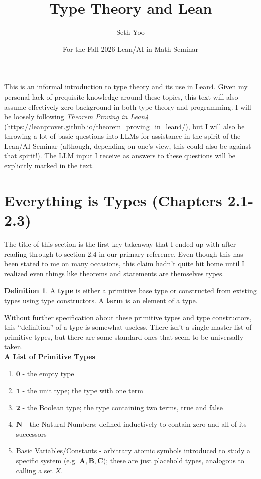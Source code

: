 \documentclass{article}
\title{Type Theory and Lean}
\author{Seth Yoo}
\date{For the Fall 2026 Lean/AI in Math Seminar}
\theoremstyle{definition}
\newtheorem{definition} [theorem] {Definition}
\newcommand{\1}{\mathbb{1}}
\newcommand{\0}{\mathbb{0}}
\newcommand{\ty}{\mathbf}
\begin{document}
\maketitle

This is an informal introduction to type theory and its use in Lean4. Given my personal lack of prequisite knowledge around these topics, this text will also assume effectively zero background in both type theory and programming. I will be loosely following \textit{Theorem Proving in Lean4} (\url{https://leanprover.github.io/theorem_proving_in_lean4/}), but I will also be throwing a lot of basic questions into LLMs for assistance in the spirit of the Lean/AI Seminar (although, depending on one's view, this could also be against that spirit!). The LLM input I receive as answers to these questions will be explicitly marked in the text. 

\section{Everything is Types (Chapters 2.1-2.3)}

The title of this section is the first key takeaway that I ended up with after reading through to section 2.4 in our primary reference. Even though this has been stated to me on many occasions, this claim hadn't quite hit home until I realized even things like theorems and statements are themselves types. 

\begin{definition}
    A \textbf{type} is either a primitive base type or constructed from existing types using type constructors. A \textbf{term} is an element of a type.
\end{definition}

Without further specification about these primitive types and type constructors, this \enquote{definition} of a type is somewhat useless. There isn't a single master list of primitive types, but there are some standard ones that seem to be universally taken. \\

\noindent\textbf{A List of Primitive Types}
\begin{enumerate}
    \item $\ty 0$ - the empty type
    \item $\ty 1$ - the unit type; the type with one term
    \item $\ty{2}$ - the Boolean type; the type containing two terms, true and false
    \item $\ty N$ - the Natural Numbers; defined inductively to contain zero and all of its successors
    \item Basic Variables/Constants - arbitrary atomic symbols introduced to study a specific system (e.g. $\ty A, \ty B, \ty C$); these are just placehold types, analogous to calling a set $X$.
\end{enumerate}
\end{document}
